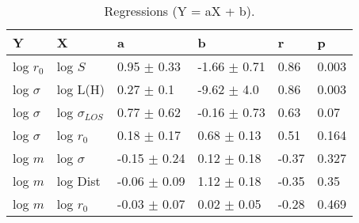 \begin{table}
\centering
\caption{Regressions (Y = aX + b).}
\begin{tabular}{llllll}
\toprule
            Y &                   X &                 a &                 b &      r &      p \\
\midrule
    log $r_0$ &             log $S$ &   0.95 $\pm$ 0.33 &  -1.66 $\pm$ 0.71 &   0.86 &  0.003 \\
 log $\sigma$ &            log L(H) &    0.27 $\pm$ 0.1 &   -9.62 $\pm$ 4.0 &   0.86 &  0.003 \\
 log $\sigma$ &  log $\sigma_{LOS}$ &   0.77 $\pm$ 0.62 &  -0.16 $\pm$ 0.73 &   0.63 &   0.07 \\
 log $\sigma$ &         log $r_{0}$ &   0.18 $\pm$ 0.17 &   0.68 $\pm$ 0.13 &   0.51 &  0.164 \\
      log $m$ &        log $\sigma$ &  -0.15 $\pm$ 0.24 &   0.12 $\pm$ 0.18 &  -0.37 &  0.327 \\
      log $m$ &            log Dist &  -0.06 $\pm$ 0.09 &   1.12 $\pm$ 0.18 &  -0.35 &   0.35 \\
      log $m$ &         log $r_{0}$ &  -0.03 $\pm$ 0.07 &   0.02 $\pm$ 0.05 &  -0.28 &  0.469 \\
\bottomrule
\end{tabular}
\end{table}
